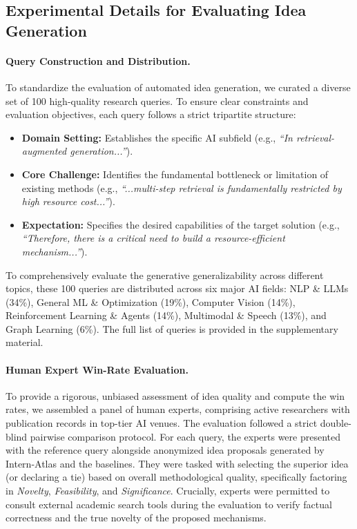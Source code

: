 \documentclass{llmxive}
\begin{document}
\subsection{Experimental Details for Evaluating Idea Generation}
\label{app:idea-gen-queries}

\paragraph{Query Construction and Distribution.}
To standardize the evaluation of automated idea generation, we curated a diverse set of 100 high-quality research queries. To ensure clear constraints and evaluation objectives, each query follows a strict tripartite structure:
\begin{itemize}
\item \textbf{Domain Setting:} Establishes the specific AI subfield (e.g., \emph{``In retrieval-augmented generation...''}).
\item \textbf{Core Challenge:} Identifies the fundamental bottleneck or limitation of existing methods (e.g., \emph{``...multi-step retrieval is fundamentally restricted by high resource cost...''}).
\item \textbf{Expectation:} Specifies the desired capabilities of the target solution (e.g., \emph{``Therefore, there is a critical need to build a resource-efficient mechanism...''}).
\end{itemize}
To comprehensively evaluate the generative generalizability across different topics, these 100 queries are distributed across six major AI fields: NLP \& LLMs (34\%), General ML \& Optimization (19\%), Computer Vision (14\%), Reinforcement Learning \& Agents (14\%), Multimodal \& Speech (13\%), and Graph Learning (6\%). The full list of queries is provided in the supplementary material.

\paragraph{Human Expert Win-Rate Evaluation.}
To provide a rigorous, unbiased assessment of idea quality and compute the win rates, we assembled a panel of human experts, comprising active researchers with publication records in top-tier AI venues. The evaluation followed a strict double-blind pairwise comparison protocol. For each query, the experts were presented with the reference query alongside anonymized idea proposals generated by Intern-Atlas and the baselines. They were tasked with selecting the superior idea (or declaring a tie) based on overall methodological quality, specifically factoring in \emph{Novelty}, \emph{Feasibility}, and \emph{Significance}. Crucially, experts were permitted to consult external academic search tools during the evaluation to verify factual correctness and the true novelty of the proposed mechanisms.
\end{document}
